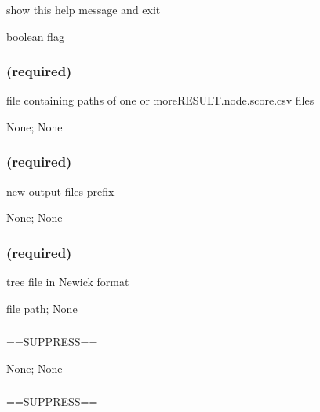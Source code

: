 \documentclass[letterpaper,12pt,english]{sphinxmanual}
\begin{document}
\subsubsection{}
\label{\detokenize{prog_desc:id3}}
 show this help message and exit

 boolean flag


\subsubsection{ (required)}
\label{\detokenize{prog_desc:d-nodedata-required}}
 file containing paths of one or moreRESULT.node.score.csv files

 None;  None


\subsubsection{ (required)}
\label{\detokenize{prog_desc:o-out-required}}
 new output files prefix

 None;  None


\subsubsection{ (required)}
\label{\detokenize{prog_desc:id4}}
 tree file in Newick format

 file path;  None


\subsubsection{}
\label{\detokenize{prog_desc:id5}}
 ==SUPPRESS==

 None;  None


\subsubsection{}
\label{\detokenize{prog_desc:p-stopk}}
 ==SUPPRESS==
\end{document}
